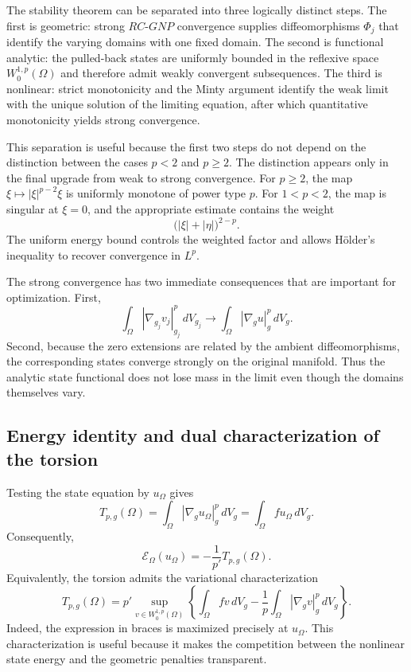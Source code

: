 \documentclass{article}
\begin{document}
The stability theorem can be separated into three logically distinct
steps. The first is geometric: strong $RC$-$GNP$ convergence supplies
diffeomorphisms $\Phi_j$ that identify the varying domains with one fixed
domain. The second is functional analytic: the pulled-back states are
uniformly bounded in the reflexive space $W_0^{1,p}(\Omega)$ and therefore
admit weakly convergent subsequences. The third is nonlinear: strict
monotonicity and the Minty argument identify the weak limit with the
unique solution of the limiting equation, after which quantitative
monotonicity yields strong convergence.

This separation is useful because the first two steps do not depend on
the distinction between the cases $p<2$ and $p\ge2$. The distinction
appears only in the final upgrade from weak to strong convergence. For
$p\ge2$, the map $\xi\mapsto|\xi|^{p-2}\xi$ is uniformly monotone of
power type $p$. For $1<p<2$, the map is singular at $\xi=0$, and the
appropriate estimate contains the weight
\[
\bigl(|\xi|+|\eta|\bigr)^{2-p}.
\]
The uniform energy bound controls the weighted factor and allows
H\"older's inequality to recover convergence in $L^p$.

The strong convergence has two immediate consequences that are important
for optimization. First,
\[
\int_\Omega|\nabla_{g_j}v_j|_{g_j}^p\,dV_{g_j}
\longrightarrow
\int_\Omega|\nabla_gu|_g^p\,dV_g.
\]
Second, because the zero extensions are related by the ambient
diffeomorphisms, the corresponding states converge strongly on the
original manifold. Thus the analytic state functional does not lose
mass in the limit even though the domains themselves vary.

\subsection{Energy identity and dual characterization of the torsion}

Testing the state equation by $u_\Omega$ gives
\[
T_{p,g}(\Omega)
=
\int_\Omega|\nabla_gu_\Omega|_g^p\,dV_g
=
\int_\Omega fu_\Omega\,dV_g.
\]
Consequently,
\[
\mathcal E_\Omega(u_\Omega)
=
-\frac1{p'}T_{p,g}(\Omega).
\]
Equivalently, the torsion admits the variational characterization
\[
T_{p,g}(\Omega)
=
p'\sup_{v\in W_0^{1,p}(\Omega)}
\left\{
\int_\Omega fv\,dV_g
-\frac1p\int_\Omega|\nabla_gv|_g^p\,dV_g
\right\}.
\]
Indeed, the expression in braces is maximized precisely at
$u_\Omega$. This characterization is useful because it makes the
competition between the nonlinear state energy and the geometric
penalties transparent.
\end{document}
